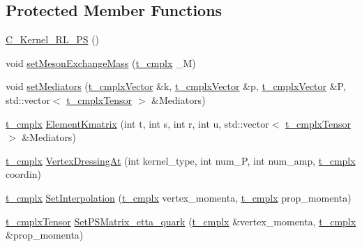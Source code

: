 \subsection*{Protected Member Functions}
\begin{DoxyCompactItemize}
\item 
\hyperlink{class_c___kernel___r_l___p_s_ace806ebf9706377ea4c8c40d866431b1}{C\-\_\-\-Kernel\-\_\-\-R\-L\-\_\-\-P\-S} ()
\item 
void \hyperlink{class_c___kernel___r_l___p_s_ad25fe96108843a814f55b5c619c5187e}{set\-Meson\-Exchange\-Mass} (\hyperlink{types_8h_aa75ae339052372f671bb263e6a272e82}{t\-\_\-cmplx} \-\_\-\-M)
\item 
void \hyperlink{class_c___kernel___r_l___p_s_a5d635af404489de546e6240b8d2a9265}{set\-Mediators} (\hyperlink{types_8h_ae8d0d77d0edff801ba45e425c85cf87d}{t\-\_\-cmplx\-Vector} \&k, \hyperlink{types_8h_ae8d0d77d0edff801ba45e425c85cf87d}{t\-\_\-cmplx\-Vector} \&p, \hyperlink{types_8h_ae8d0d77d0edff801ba45e425c85cf87d}{t\-\_\-cmplx\-Vector} \&P, std\-::vector$<$ \hyperlink{types_8h_a23430de2ae483000af45037b36fedba8}{t\-\_\-cmplx\-Tensor} $>$ \&Mediators)
\item 
\hyperlink{types_8h_aa75ae339052372f671bb263e6a272e82}{t\-\_\-cmplx} \hyperlink{class_c___kernel___r_l___p_s_a57c4a7e5c0c4db8d61a8b547ae9f23af}{Element\-Kmatrix} (int t, int s, int r, int u, std\-::vector$<$ \hyperlink{types_8h_a23430de2ae483000af45037b36fedba8}{t\-\_\-cmplx\-Tensor} $>$ \&Mediators)
\item 
\hyperlink{types_8h_aa75ae339052372f671bb263e6a272e82}{t\-\_\-cmplx} \hyperlink{class_c___kernel___r_l___p_s_a6323065c3d5d268f755a7107ffea5506}{Vertex\-Dressing\-At} (int kernel\-\_\-type, int num\-\_\-\-P, int num\-\_\-amp, \hyperlink{types_8h_aa75ae339052372f671bb263e6a272e82}{t\-\_\-cmplx} coordin)
\item 
\hyperlink{types_8h_aa75ae339052372f671bb263e6a272e82}{t\-\_\-cmplx} \hyperlink{class_c___kernel___r_l___p_s_abbad3a288bd15c6d4ce71f2880f096cf}{Set\-Interpolation} (\hyperlink{types_8h_aa75ae339052372f671bb263e6a272e82}{t\-\_\-cmplx} vertex\-\_\-momenta, \hyperlink{types_8h_aa75ae339052372f671bb263e6a272e82}{t\-\_\-cmplx} prop\-\_\-momenta)
\item 
\hyperlink{types_8h_a23430de2ae483000af45037b36fedba8}{t\-\_\-cmplx\-Tensor} \hyperlink{class_c___kernel___r_l___p_s_a59837c29b2f0f580bba3f506998b5095}{Set\-P\-S\-Matrix\-\_\-etta\-\_\-quark} (\hyperlink{types_8h_aa75ae339052372f671bb263e6a272e82}{t\-\_\-cmplx} \&vertex\-\_\-momenta, \hyperlink{types_8h_aa75ae339052372f671bb263e6a272e82}{t\-\_\-cmplx} \&prop\-\_\-momenta)

\end{DoxyCompactItemize}
